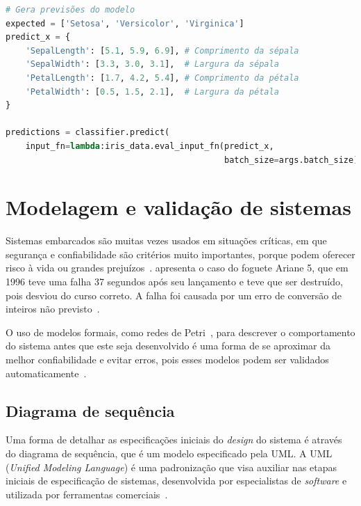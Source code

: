 \begin{lstfloat}
\begin{lstlisting}[language=Python,caption={Fazendo previsões a partir do modelo treinado no TensorFlow},label={lst:tf_dnn_3}]
# Gera previsões do modelo
expected = ['Setosa', 'Versicolor', 'Virginica']
predict_x = {
    'SepalLength': [5.1, 5.9, 6.9], # Comprimento da sépala
    'SepalWidth': [3.3, 3.0, 3.1],  # Largura da sépala
    'PetalLength': [1.7, 4.2, 5.4], # Comprimento da pétala
    'PetalWidth': [0.5, 1.5, 2.1],  # Largura da pétala
}

predictions = classifier.predict(
    input_fn=lambda:iris_data.eval_input_fn(predict_x,
                                            batch_size=args.batch_size))

\end{lstlisting}
\end{lstfloat}

\section{Modelagem e validação de sistemas}\label{sec:modelosformais}

Sistemas embarcados são muitas vezes usados em situações críticas, em que segurança e confiabilidade são critérios muito importantes, porque podem oferecer risco à vida ou grandes prejuízos~\cite{edwards:1997}.  apresenta o caso do foguete Ariane 5, que em 1996 teve uma falha 37 segundos após seu lançamento e teve que ser destruído, pois desviou do curso correto. A falha foi causada por um erro de conversão de inteiros não previsto~\cite{buttazzo2011:realtime}.

O uso de modelos formais, como redes de Petri~\cite{peterson:1981}, para descrever o comportamento do sistema antes que este seja desenvolvido é uma forma de se aproximar da melhor confiabilidade e evitar erros, pois esses modelos podem ser validados automaticamente~\cite{edwards:1997}.

\subsection{Diagrama de sequência}
Uma forma de detalhar as especificações iniciais do \textit{design} do sistema é através do diagrama de sequência, que é um modelo especificado pela UML\@. A UML (\textit{Unified Modeling Language}) é uma padronização que visa auxiliar nas etapas iniciais de especificação de sistemas, desenvolvida por especialistas de \textit{software} e utilizada por ferramentas comerciais~\cite{marwedel:2010}.

